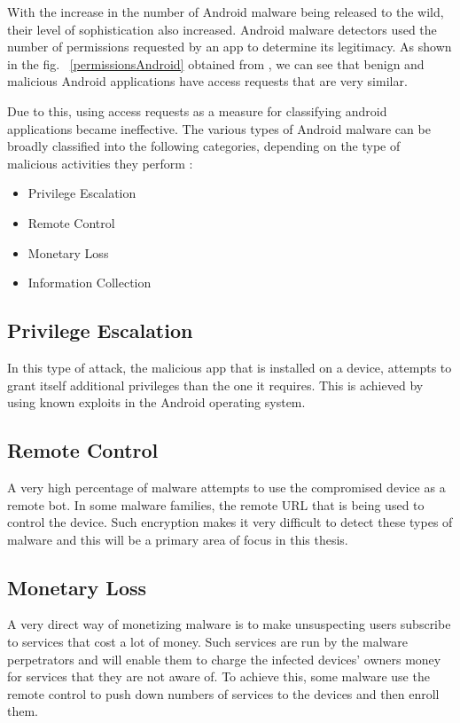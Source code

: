 With the increase in the number of Android malware being released to the wild, their level of sophistication also increased. Android malware detectors used the number of permissions requested by an app to determine its legitimacy. As shown in the fig. ~\ref{permissionsAndroid} obtained from \cite{zhou}, we can see that benign and malicious Android applications have access requests that are very similar.

Due to this, using access requests as a measure for classifying android applications became ineffective. The various types of Android malware can be broadly classified into the following categories, depending on the type of malicious activities they perform \cite{zhou}:

\begin{itemize}
	\item Privilege Escalation
	\item Remote Control
	\item Monetary Loss
	\item Information Collection
\end{itemize}

\subsection{Privilege Escalation}
In this type of attack, the malicious app that is installed on a device, attempts to grant itself additional privileges than the one it requires. This is achieved by using known exploits in the Android operating system.
\subsection{Remote Control}
A very high percentage of malware attempts to use the compromised device as a remote bot. In some malware families, the remote URL that is being used to control the device. Such encryption makes it very difficult to detect these types of malware and this will be a primary area of focus in this thesis.
\subsection{Monetary Loss}
A very direct way of monetizing malware is to make unsuspecting users subscribe to services that cost a lot of money. Such services are run by the malware perpetrators and will enable them to charge the infected devices' owners money for services that they are not aware of. To achieve this, some malware use the remote control to push down numbers of services to the devices and then enroll them.

